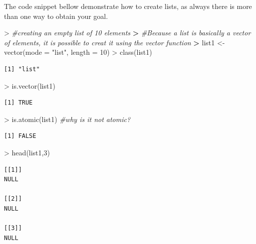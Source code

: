 \documentclass[
]{book}
\newenvironment{Shaded}{\begin{snugshade}}{\end{snugshade}}
\newcommand{\AttributeTok}[1]{\textcolor[rgb]{0.77,0.63,0.00}{#1}}
\newcommand{\CommentTok}[1]{\textcolor[rgb]{0.56,0.35,0.01}{\textit{#1}}}
\newcommand{\DecValTok}[1]{\textcolor[rgb]{0.00,0.00,0.81}{#1}}
\newcommand{\ErrorTok}[1]{\textcolor[rgb]{0.64,0.00,0.00}{\textbf{#1}}}
\newcommand{\FunctionTok}[1]{\textcolor[rgb]{0.00,0.00,0.00}{#1}}
\newcommand{\NormalTok}[1]{#1}
\newcommand{\OtherTok}[1]{\textcolor[rgb]{0.56,0.35,0.01}{#1}}
\newcommand{\SpecialCharTok}[1]{\textcolor[rgb]{0.00,0.00,0.00}{#1}}
\newcommand{\StringTok}[1]{\textcolor[rgb]{0.31,0.60,0.02}{#1}}
\theoremstyle{definition}
\theoremstyle{definition}
\theoremstyle{definition}
\theoremstyle{definition}
\theoremstyle{remark}
\begin{document}
The code snippet bellow demonstrate how to create lists, as always there is more than one way to obtain your goal.

\begin{Shaded}
\begin{Highlighting}[]
\SpecialCharTok{\textgreater{}} \CommentTok{\#creating an empty list of 10 elements}
\ErrorTok{\textgreater{}} \CommentTok{\#Because a list is basically a vector of elements, it is possible to creat it using the vector function}
\ErrorTok{\textgreater{}}\NormalTok{ list1 }\OtherTok{\textless{}{-}} \FunctionTok{vector}\NormalTok{(}\AttributeTok{mode =} \StringTok{"list"}\NormalTok{, }\AttributeTok{length =} \DecValTok{10}\NormalTok{)}
\SpecialCharTok{\textgreater{}} \FunctionTok{class}\NormalTok{(list1)}
\end{Highlighting}
\end{Shaded}

\begin{verbatim}
[1] "list"
\end{verbatim}

\begin{Shaded}
\begin{Highlighting}[]
\SpecialCharTok{\textgreater{}} \FunctionTok{is.vector}\NormalTok{(list1)}
\end{Highlighting}
\end{Shaded}

\begin{verbatim}
[1] TRUE
\end{verbatim}

\begin{Shaded}
\begin{Highlighting}[]
\SpecialCharTok{\textgreater{}} \FunctionTok{is.atomic}\NormalTok{(list1) }\CommentTok{\#why is it not atomic?}
\end{Highlighting}
\end{Shaded}

\begin{verbatim}
[1] FALSE
\end{verbatim}

\begin{Shaded}
\begin{Highlighting}[]
\SpecialCharTok{\textgreater{}} \FunctionTok{head}\NormalTok{(list1,}\DecValTok{3}\NormalTok{)}
\end{Highlighting}
\end{Shaded}

\begin{verbatim}
[[1]]
NULL

[[2]]
NULL

[[3]]
NULL
\end{verbatim}
\end{document}
